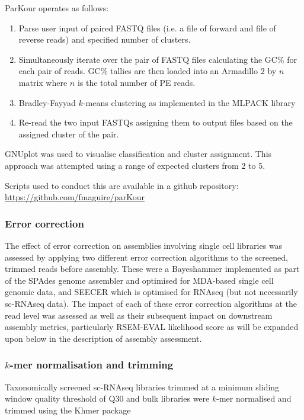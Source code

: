 ParKour operates as follows:
\begin{enumerate}
    \item Parse user input of paired FASTQ files (i.e. a file of forward and file of reverse reads) and specified number of clusters.
    \item Simultaneously iterate over the pair of FASTQ files calculating the GC\% for each pair of reads. GC\% tallies are then loaded into an Armadillo \(2\) by \(n\) matrix \citep{Sanderson2010} where \(n\) is the total number of PE reads.
    \item Bradley-Fayyad \(k\)-means \citep{Bradley1998} clustering as implemented in the MLPACK library \citep{mlpack2013}
    \item Re-read the two input FASTQs assigning them to output files based on the assigned cluster of the pair.
\end{enumerate}

GNUplot \citep{Gnuplot44} was used to visualise classification and cluster assignment.
This approach was attempted using a range of expected clusters from 2 to 5.

Scripts used to conduct this are available in a github repository:
\url{https://github.com/fmaguire/parKour}

\subsubsection{Error correction}

The effect of error correction on assemblies involving single cell libraries was assessed 
by applying two different error correction algorithms to the screened, trimmed reads before assembly.
These were a Bayeshammer \citep{Nikolenko2013} implemented as part of the SPAdes 
genome assembler \citep{Bankevich2012} and optimised for MDA-based single cell genomic data, 
and SEECER \citep{Le2013} which is optimised for RNAseq (but not necessarily sc-RNAseq
data). 
The impact of each of these error correction algorithms at the read level was assessed as well 
as their subsequent impact on downstream assembly metrics, particularly RSEM-EVAL likelihood score
as will be expanded upon below in the description of assembly assessment.

\subsubsection{\(k\)-mer normalisation and trimming}

Taxonomically screened sc-RNAseq libraries trimmed at a minimum sliding window quality
threshold of Q30 and bulk libraries were \(k\)-mer normalised and trimmed using the Khmer package \citep{Crusoe2015}


